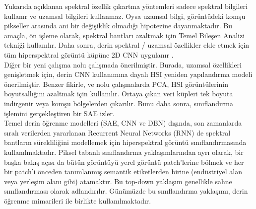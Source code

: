 	Yukarıda açıklanan spektral özellik çıkartma yöntemleri sadece spektral bilgileri kullanır ve uzamsal bilgileri kullanmaz. Oysa uzamsal bilgi, görüntüdeki komşu pikseller arasında ani bir değişiklik olmadığı hipotezine dayanmaktadır. Bu amaçla, ön işleme olarak, spektral bantları azaltmak için Temel Bileşen Analizi tekniği kullanılır. Daha sonra, derin spektral / uzamsal özellikler elde etmek için tüm hiperspektral görüntü küpüne 2D CNN uygulanır \cite{liang2016hyperspectral}.\\
	
Diğer bir yeni çalışma \cite{li2017hyperspectral} nolu çalışmada önerilmiştir. Burada, uzamsal özellikleri genişletmek için, derin CNN kullanımına dayalı HSI yeniden yapılandırma modeli önerilmiştir. Benzer fikirle, \cite{chen2014deep} ve \cite{lin2013spectral} nolu çalışmalarda PCA, HSI görüntülerinin boyutsallığını azaltmak için kullanılır. Ortaya çıkan veri küpleri tek boyuta indirgenir veya komşu bölgelerden çıkarılır. Bunu daha sonra, sınıflandırma işlemini gerçekleştiren bir SAE izler. \\

	Temel derin öğrenme modelleri (SAE, CNN ve DBN) dışında, son zamanlarda sıralı verilerden yararlanan Recurrent Neural Networks (RNN) de spektral bantların sürekliliğini modellemek için hiperspektral görüntü sınıflandırmasında kullanılmaktadır.
	Piksel tabanlı sınıflandırma yaklaşımlarından ayrı olarak, bir başka bakış açısı da bütün görüntüyü yerel görüntü patch’lerine bölmek ve her bir patch’i önceden tanımlanmış semantik
etiketlerden birine (endüstriyel alan veya yerleşim alanı gibi) atamaktır. Bu top-down yaklaşım genellikle sahne sınıflandırması olarak adlandırılır. Günümüzde bu sınıflandırma yaklaşımı, derin öğrenme mimarileri ile birlikte kullanılmaktadır. 

